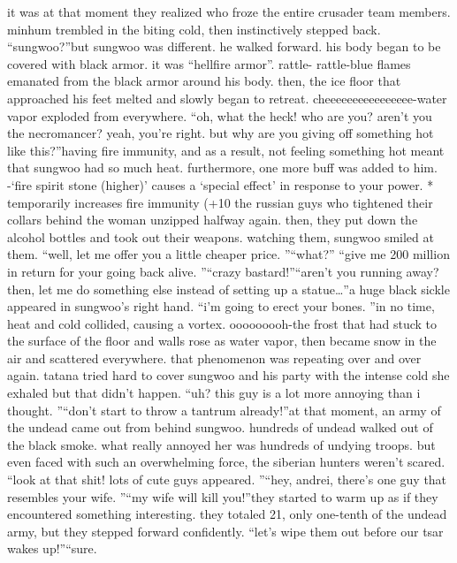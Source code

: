 it was at that moment they realized who froze the entire crusader team members.
minhum trembled in the biting cold, then instinctively stepped back.
“sungwoo?”but sungwoo was different.
 he walked forward.
 his body began to be covered with black armor.
 it was “hellfire armor”.
rattle- rattle-blue flames emanated from the black armor around his body.
 then, the ice floor that approached his feet melted and slowly began to retreat.
cheeeeeeeeeeeeeeee-water vapor exploded from everywhere.
“oh, what the heck! who are you? aren’t you the necromancer? yeah, you’re right.
 but why are you giving off something hot like this?”having fire immunity, and as a result, not feeling something hot meant that sungwoo had so much heat.
furthermore, one more buff was added to him.
-‘fire spirit stone (higher)’ causes a ‘special effect’ in response to your power.
* temporarily increases fire immunity (+10%
 the russian guys who tightened their collars behind the woman unzipped halfway again.
 then, they put down the alcohol bottles and took out their weapons.
watching them, sungwoo smiled at them.
“well, let me offer you a little cheaper price.
”“what?”
“give me 200 million in return for your going back alive.
”“crazy bastard!”“aren’t you running away? then, let me do something else instead of setting up a statue…”a huge black sickle appeared in sungwoo’s right hand.
“i’m going to erect your bones.
”in no time, heat and cold collided, causing a vortex.
ooooooooh-the frost that had stuck to the surface of the floor and walls rose as water vapor, then became snow in the air and scattered everywhere.
 that phenomenon was repeating over and over again.
tatana tried hard to cover sungwoo and his party with the intense cold she exhaled but that didn’t happen.
“uh? this guy is a lot more annoying than i thought.
”“don’t start to throw a tantrum already!”at that moment, an army of the undead came out from behind sungwoo.
 hundreds of undead walked out of the black smoke.
 what really annoyed her was hundreds of undying troops.
but even faced with such an overwhelming force, the siberian hunters weren’t scared.
“look at that shit! lots of cute guys appeared.
”“hey, andrei, there’s one guy that resembles your wife.
”“my wife will kill you!”they started to warm up as if they encountered something interesting.
 they totaled 21, only one-tenth of the undead army, but they stepped forward confidently.
“let’s wipe them out before our tsar wakes up!”“sure.
